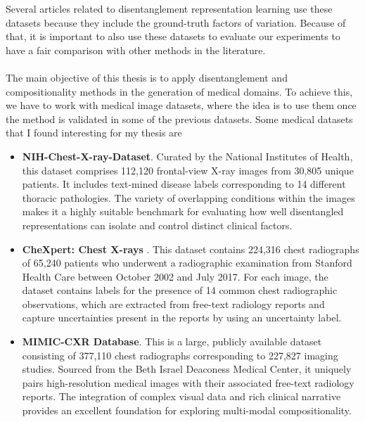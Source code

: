 Several articles related to disentanglement representation learning use these datasets because they include the ground-truth factors of variation. Because of that, it is important to also use these datasets to evaluate our experiments to have a fair comparison with other methods in the literature. \\
\\
The main objective of this thesis is to apply disentanglement and compositionality methods in the generation of medical domains. To achieve this, we have to work with medical image datasets, where the idea is to use them once the method is validated in some of the previous datasets. Some medical datasets that I found interesting for my thesis are
\begin{itemize}
    \item \textbf{NIH-Chest-X-ray-Dataset}. Curated by the National Institutes of Health, this dataset comprises 112,120 frontal-view X-ray images from 30,805 unique patients. It includes text-mined disease labels corresponding to 14 different thoracic pathologies. The variety of overlapping conditions within the images makes it a highly suitable benchmark for evaluating how well disentangled representations can isolate and control distinct clinical factors.
    \item \textbf{CheXpert: Chest X-rays} \cite{irvin2019chexpertlargechestradiograph}. This dataset contains 224,316 chest radiographs of 65,240 patients who underwent a radiographic examination from Stanford Health Care between October 2002 and July 2017. For each image, the dataset contains labels for the presence of 14 common chest radiographic observations, which are extracted from free-text radiology reports and capture uncertainties present in the reports by using an uncertainty label. 
    \item \textbf{MIMIC-CXR Database}. This is a large, publicly available dataset consisting of 377,110 chest radiographs corresponding to 227,827 imaging studies. Sourced from the Beth Israel Deaconess Medical Center, it uniquely pairs high-resolution medical images with their associated free-text radiology reports. The integration of complex visual data and rich clinical narrative provides an excellent foundation for exploring multi-modal compositionality.
\end{itemize}




